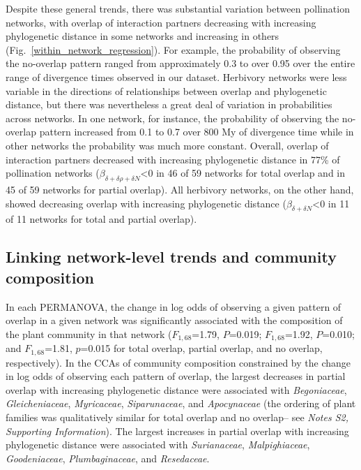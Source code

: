 \documentclass[12pt]{article}
\begin{document}
\begin{spacing}{1.5}
    Despite these general trends, there was substantial variation between 
    pollination networks, with overlap of interaction partners decreasing 
    with increasing phylogenetic distance in some networks and increasing in 
    others (Fig.~\ref{within_network_regression}). For example, the 
    probability of observing the no-overlap pattern ranged from approximately 
    0.3 to over 0.95 over the entire range of divergence times observed in 
    our dataset. Herbivory networks were less variable in the directions of
    relationships between overlap and phylogenetic distance, but there was
    nevertheless a great deal of variation in probabilities across networks.
    In one network, for instance, the probability of observing the no-overlap
    pattern increased from 0.1 to 0.7 over 800 My of divergence time while
    in other networks the probability was much more constant. Overall, overlap 
    of interaction partners decreased with increasing phylogenetic distance in 
    77\% of pollination networks ($\beta_{\delta+\delta\rho+\delta N} $\textless0 
    in 46 of 59 networks for total overlap and in 45 of 59 networks for partial 
    overlap). All herbivory networks, on the other hand, showed decreasing overlap 
    with increasing  phylogenetic distance ($\beta_{\delta + \delta N}$\textless0 
    in 11 of 11 networks for total and partial overlap).


  \subsection*{Linking network-level trends and community composition}

    In each PERMANOVA, the change in log odds of observing a given 
    pattern of overlap in a given network was significantly associated 
    with the composition of the plant community in that network
    ($F_{1,68}$=1.79, $P$=0.019; $F_{1,68}$=1.92, 
    $P$=0.010; and $F_{1,68}$=1.81, $p$=0.015 for total
    overlap, partial overlap, and no overlap, respectively). 
    In the CCAs of community composition constrained by the change in
    log odds of observing each pattern of overlap, the largest decreases 
    in partial overlap with increasing phylogenetic distance were associated 
    with \emph{Begoniaceae}, \emph{Gleicheniaceae}, \emph{Myricaceae}, 
    \emph{Siparunaceae}, and \emph{Apocynaceae} (the ordering of plant
    families was qualitatively similar for total overlap and no overlap--
    see \emph{Notes S2, Supporting Information}). The largest increases
    in partial overlap with increasing phylogenetic distance were 
    associated with \emph{Surianaceae}, \emph{Malpighiaceae},
    \emph{Goodeniaceae}, \emph{Plumbaginaceae}, and \emph{Resedaceae}.



\end{spacing}
\end{document}
